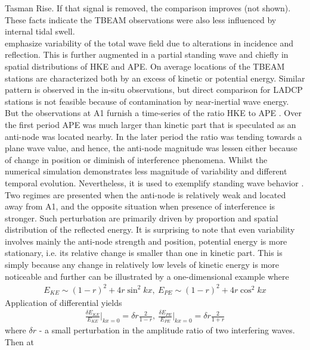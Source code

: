 \documentclass[12pt]{article}
\begin{document}
Tasman Rise. If that signal is removed, the comparison improves (not shown). These facts indicate 
the TBEAM observations were also less influenced by internal tidal swell. \\
 emphasize variability of the total wave field due to 
alterations in incidence and reflection. This is further augmented in a partial standing wave and 
chiefly in spatial distributions of HKE and APE. On average  locations of the TBEAM stations are characterized both by an excess of kinetic 
or potential energy. Similar pattern is observed in the in-situ observations, but direct 
comparison for LADCP stations is not feasible because of contamination by near-inertial wave 
energy. But the observations at A1 furnish a time-series of the ratio HKE to APE 
. Over the first period APE was much larger 
than kinetic part that is speculated as an anti-node was located nearby. In the later period the 
ratio was tending towards a plane wave value, and hence, the anti-node magnitude was lessen either 
because of change in position or diminish of interference phenomena. Whilst the numerical 
simulation 
demonstrates less magnitude of variability and different temporal evolution. Nevertheless, it is 
used to exemplify standing wave behavior . Two regimes are 
presented when the 
anti-node is relatively weak and located away from A1, and the opposite situation when presence of 
interference is stronger. Such perturbation are primarily driven by proportion and spatial 
distribution of the reflected energy. It is surprising to note that even variability involves 
mainly the anti-node strength and position, potential energy is more stationary, i.e. its relative 
change is smaller than one in kinetic part. This is simply because any change in relatively low 
levels of kinetic energy is more noticeable and further can be illustrated by a one-dimensional 
example \citep{martini2007diagnosing} where 
\begin{align}
E_{KE} \sim (1 - r)^2 + 4r \sin^2{k x},~E_{PE} \sim (1 - r)^2 + 4r \cos^2{k x}
\end{align}
Application of differential yields
\begin{align}
\frac{\delta E_{KE}}{E_{KE}}\big|_{kx = 0} = \delta r \frac{2}{1 - r},~\frac{\delta 
	E_{PE}}{E_{PE}}\big|_{kx = 0} = \delta r \frac{2}{1 + r}
\end{align}
where $\delta r$ - a small perturbation in the amplitude ratio of two interfering waves. Then at 
\end{document}

